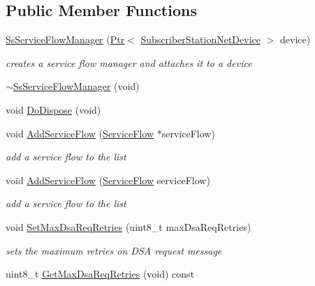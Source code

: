 \subsection*{Public Member Functions}
\begin{DoxyCompactItemize}
\item 
\hyperlink{classns3_1_1SsServiceFlowManager_a8077cedc8e908b23e806aa303e2b8a53}{Ss\+Service\+Flow\+Manager} (\hyperlink{classns3_1_1Ptr}{Ptr}$<$ \hyperlink{classns3_1_1SubscriberStationNetDevice}{Subscriber\+Station\+Net\+Device} $>$ device)
\begin{DoxyCompactList}\small\item\em creates a service flow manager and attaches it to a device \end{DoxyCompactList}\item 
\hyperlink{classns3_1_1SsServiceFlowManager_a6e8b49be3479047fbea0220f078e20bc}{$\sim$\+Ss\+Service\+Flow\+Manager} (void)
\item 
void \hyperlink{classns3_1_1SsServiceFlowManager_a62a5f8679d62c10b9666275dc5e67021}{Do\+Dispose} (void)
\item 
void \hyperlink{classns3_1_1SsServiceFlowManager_a7d715fb4553b80c4cf586798a0664bb2}{Add\+Service\+Flow} (\hyperlink{classns3_1_1ServiceFlow}{Service\+Flow} $\ast$service\+Flow)
\begin{DoxyCompactList}\small\item\em add a service flow to the list \end{DoxyCompactList}\item 
void \hyperlink{classns3_1_1SsServiceFlowManager_a9d2bbc3e2754f80cc80e2febef1e3a2b}{Add\+Service\+Flow} (\hyperlink{classns3_1_1ServiceFlow}{Service\+Flow} service\+Flow)
\begin{DoxyCompactList}\small\item\em add a service flow to the list \end{DoxyCompactList}\item 
void \hyperlink{classns3_1_1SsServiceFlowManager_ac4964cf5da874331320c8434c2f48f59}{Set\+Max\+Dsa\+Req\+Retries} (uint8\+\_\+t max\+Dsa\+Req\+Retries)
\begin{DoxyCompactList}\small\item\em sets the maximum retries on D\+SA request message \end{DoxyCompactList}\item 
uint8\+\_\+t \hyperlink{classns3_1_1SsServiceFlowManager_aeeb9b44bac32dcbe8d5e2c60f81c8d1e}{Get\+Max\+Dsa\+Req\+Retries} (void) const 
\item 

\end{DoxyCompactItemize}
